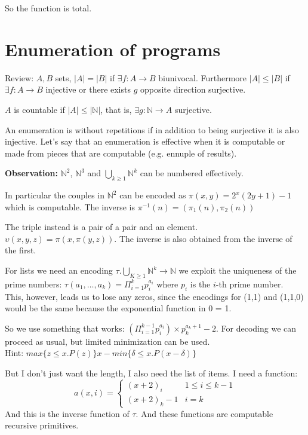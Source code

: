 \documentclass{amsbook}
\newcommand{\nat}{\ensuremath{\mathbb{N}}}
\theoremstyle{definition}
\theoremstyle{remark}
\numberwithin{section}{chapter}
\numberwithin{equation}{chapter}
\begin{document}
So the function is total.

\chapter{Enumeration of programs}

Review: $ A, B $ sets, $ |A| = |B| $ if $ \exists f:A\rightarrow B $ biunivocal. Furthermore $ |A| \leq |B| $ if $ \exists f:A\rightarrow B $ injective or there exists $g$ opposite direction surjective.

$A$ is countable if $ |A| \leq |\nat| $, that is, $ \exists g: \nat \rightarrow A $ surjective.

An enumeration is without repetitions if in addition to being surjective it is also injective. Let's say that an enumeration is effective when it is computable or made from pieces that are computable (e.g. ennuple of results).

\textbf{Observation:} $ \nat^2 $, $ \nat^3 $ and $ \bigcup_{k\geq 1} \nat^k $ can be numbered effectively.

In particular the couples in $ \nat^2 $ can be encoded as $ \pi(x,y) = 2^x(2y+1)-1 $ which is computable. The inverse is $ \pi^{-1}(n) = (\pi_1(n), \pi_2(n)) $

The triple instead is a pair of a pair and an element. $ \upsilon (x,y,z) = \pi (x, \pi(y,z))$. The inverse is also obtained from the inverse of the first.

For lists we need an encoding $ \tau . \bigcup_{K \geq 1} \nat^k \rightarrow \nat $ we exploit the uniqueness of the prime numbers: $ \tau(a_1,\dots,a_k) = \Pi_{i=1}^k p_i^{a_i}$ where $ p_i $ is the $i$-th prime number.\\This, however, leads us to lose any zeros, since the encodings for (1,1) and (1,1,0) would be the same because the exponential function in 0 = 1.

So we use something that works: $ (\Pi_{i=1}^{k-1} p_i^{a_i}) \times p_k^{a_k+1} - 2$. For decoding we can proceed as usual, but limited minimization can be used.\\ Hint: $ max \{z \leq x . P(z)\} x - min\{\delta \leq x . P(x-\delta)\}$

But I don't just want the length, I also need the list of items. I need a function: \begin{equation*}
	a(x,i) = \begin{cases}
		(x+2)_i   & 1 \leq i \leq k-1 \\
		(x+2)_k-1 & i = k
	\end{cases}
\end{equation*}
And this is the inverse function of $\tau$. And these functions are computable recursive primitives.
\end{document}
